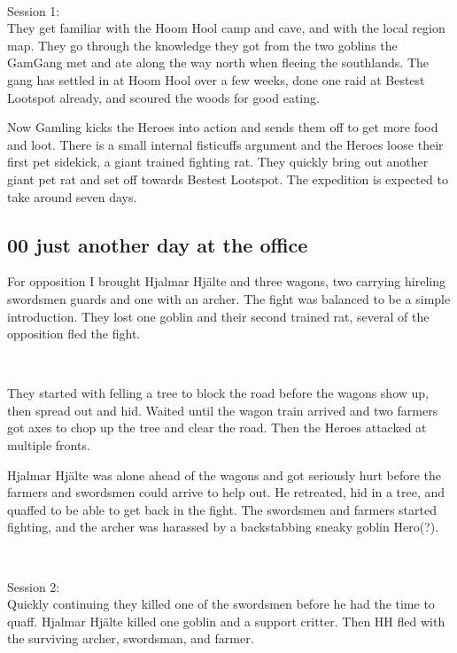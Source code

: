 \

Session 1:\\                                                            %
They get familiar with the Hoom Hool camp and cave, and with the local region map. They go through the knowledge they got from the two goblins the GamGang met and ate along the way north when fleeing the southlands. The gang has settled in at Hoom Hool over a few weeks, done one raid at Bestest Lootspot already, and scoured the woods for good eating.

Now Gamling kicks the Heroes into action and sends them off to get more food and loot. There is a small internal fisticuffs argument and the Heroes loose their first pet sidekick, a giant trained fighting rat. They quickly bring out another giant pet rat and set off towards Bestest Lootspot. The expedition is expected to take around seven days.


\subsection*{00 just another day at the office}

For opposition I brought Hjalmar Hjälte and three wagons, two carrying hireling swordsmen guards and one with an archer.
The fight was balanced to be a simple introduction. They lost one goblin and their second trained rat, several of the opposition fled the fight.

\

They started with felling a tree to block the road before the wagons show up, then spread out and hid. Waited until the wagon train arrived and two farmers got axes to chop up the tree and clear the road. Then the Heroes attacked at multiple fronts.

Hjalmar Hjälte was alone ahead of the wagons and got seriously hurt before the farmers and swordsmen could arrive to help out. He retreated, hid in a tree, and quaffed to be able to get back in the fight. The swordsmen and farmers started fighting, and the archer was harassed by a backstabbing sneaky goblin Hero(?).

\

Session 2: \\                                                           %
Quickly continuing they killed one of the swordsmen before he had the time to quaff. Hjalmar Hjälte killed one goblin and a support critter. Then HH fled with the surviving archer, swordsman, and farmer. 

